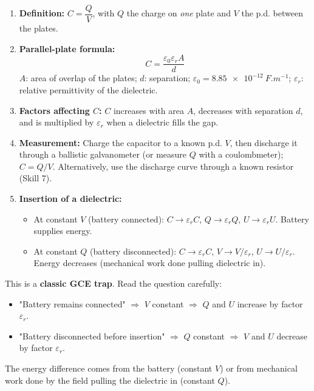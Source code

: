 \documentclass[11pt]{article}
\begin{document}
\begin{methode}
\begin{enumerate}
\item \textbf{Definition:} $C = \dfrac{Q}{V}$, with $Q$ the charge on \emph{one} plate and $V$ the p.d. between the plates.
\item \textbf{Parallel-plate formula:}
\[ C = \frac{\varepsilon_0 \varepsilon_r A}{d} \]
$A$: area of overlap of the plates; $d$: separation; $\varepsilon_0 = \SI{8.85e-12}{F.m^{-1}}$; $\varepsilon_r$: relative permittivity of the dielectric.
\item \textbf{Factors affecting $C$:} $C$ increases with area $A$, decreases with separation $d$, and is multiplied by $\varepsilon_r$ when a dielectric fills the gap.
\item \textbf{Measurement:} Charge the capacitor to a known p.d. $V$, then discharge it through a ballistic galvanometer (or measure $Q$ with a coulombmeter); $C = Q/V$. Alternatively, use the discharge curve through a known resistor (Skill 7).
\item \textbf{Insertion of a dielectric:}
\begin{itemize}
\item At constant $V$ (battery connected): $C \to \varepsilon_r C$, $Q \to \varepsilon_r Q$, $U \to \varepsilon_r U$. Battery supplies energy.
\item At constant $Q$ (battery disconnected): $C \to \varepsilon_r C$, $V \to V/\varepsilon_r$, $U \to U/\varepsilon_r$. Energy decreases (mechanical work done pulling dielectric in).
\end{itemize}
\end{enumerate}
\end{methode}

\begin{attention}
This is a \textbf{classic GCE trap}. Read the question carefully:
\begin{itemize}
\item "Battery remains connected" $\Rightarrow$ $V$ constant $\Rightarrow$ $Q$ and $U$ increase by factor $\varepsilon_r$.
\item "Battery disconnected before insertion" $\Rightarrow$ $Q$ constant $\Rightarrow$ $V$ and $U$ decrease by factor $\varepsilon_r$.
\end{itemize}
The energy difference comes from the battery (constant $V$) or from mechanical work done by the field pulling the dielectric in (constant $Q$).
\end{attention}
\end{document}

